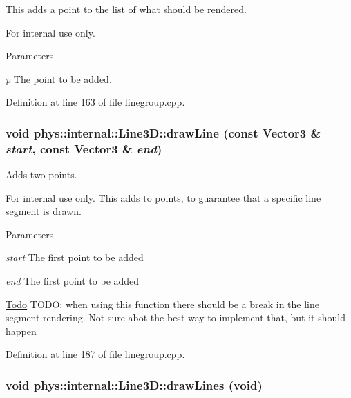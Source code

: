 This adds a point to the list of what should be rendered. 

\begin{DoxyInternal}{For internal use only.}

\begin{DoxyParams}{Parameters}
\item[{\em p}]The point to be added. \end{DoxyParams}
\end{DoxyInternal}


Definition at line 163 of file linegroup.cpp.

\hypertarget{classphys_1_1internal_1_1Line3D_a31bf19dc06547cbe042e1ddfbcf672f3}{
\subsubsection[{drawLine}]{\setlength{\rightskip}{0pt plus 5cm}void phys::internal::Line3D::drawLine (const {\bf Vector3} \& {\em start}, \/  const {\bf Vector3} \& {\em end})}}
\label{d4/db5/classphys_1_1internal_1_1Line3D_a31bf19dc06547cbe042e1ddfbcf672f3}


Adds two points. 

\begin{DoxyInternal}{For internal use only.}
This adds to points, to guarantee that a specific line segment is drawn. 
\begin{DoxyParams}{Parameters}
\item[{\em start}]The first point to be added \item[{\em end}]The first point to be added \end{DoxyParams}
\end{DoxyInternal}


\begin{Desc}
\item[\hyperlink{todo__todo000009}{Todo}]TODO: when using this function there should be a break in the line segment rendering. Not sure abot the best way to implement that, but it should happen \end{Desc}




Definition at line 187 of file linegroup.cpp.

\hypertarget{classphys_1_1internal_1_1Line3D_a008f0874c2213002e0c39330561f80f2}{
\subsubsection[{drawLines}]{\setlength{\rightskip}{0pt plus 5cm}void phys::internal::Line3D::drawLines (void)}}
\label{d4/db5/classphys_1_1internal_1_1Line3D_a008f0874c2213002e0c39330561f80f2}


